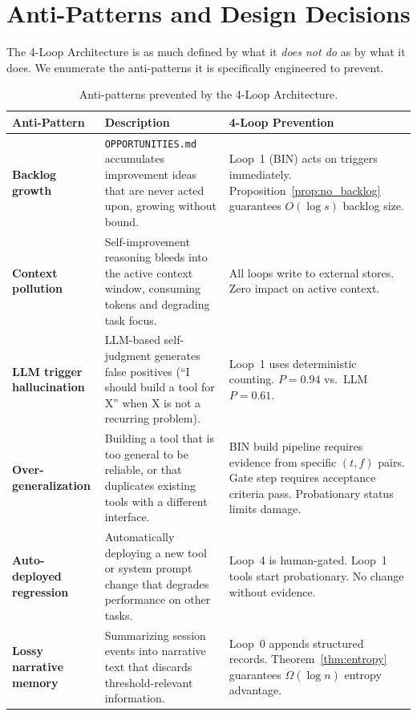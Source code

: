 \section{Anti-Patterns and Design Decisions}

\label{sec:antipatterns}

The 4-Loop Architecture is as much defined by what it \emph{does not do} as
by what it does. We enumerate the anti-patterns it is specifically engineered
to prevent.

\begin{table}[H]
\centering
\caption{Anti-patterns prevented by the 4-Loop Architecture.}
\label{tab:antipatterns}
\begin{tabularx}{\textwidth}{lXX}
\toprule
Anti-Pattern & Description & 4-Loop Prevention \\
\midrule
\textbf{Backlog growth} &
\texttt{OPPORTUNITIES.md} accumulates improvement ideas that are never
acted upon, growing without bound. &
Loop~1 (BIN) acts on triggers immediately. Proposition~\ref{prop:no_backlog}
guarantees $O(\log s)$ backlog size. \\[6pt]

\textbf{Context pollution} &
Self-improvement reasoning bleeds into the active context window, consuming
tokens and degrading task focus. &
All loops write to external stores. Zero impact on active context. \\[6pt]

\textbf{LLM trigger hallucination} &
LLM-based self-judgment generates false positives (``I should build a tool
for X'' when X is not a recurring problem). &
Loop~1 uses deterministic counting. $P = 0.94$ vs.\ LLM $P = 0.61$. \\[6pt]

\textbf{Over-generalization} &
Building a tool that is too general to be reliable, or that duplicates
existing tools with a different interface. &
BIN build pipeline requires evidence from specific $(t,f)$ pairs.
Gate step requires acceptance criteria pass. Probationary status limits damage. \\[6pt]

\textbf{Auto-deployed regression} &
Automatically deploying a new tool or system prompt change that degrades
performance on other tasks. &
Loop~4 is human-gated. Loop~1 tools start probationary. No change without evidence. \\[6pt]

\textbf{Lossy narrative memory} &
Summarizing session events into narrative text that discards threshold-relevant
information. &
Loop~0 appends structured records. Theorem~\ref{thm:entropy} guarantees
$\Omega(\log n)$ entropy advantage. \\[6pt]


\end{tabularx}
\end{table}
